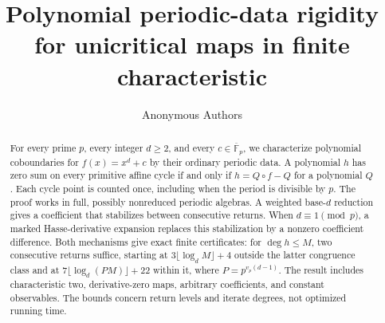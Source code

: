 \documentclass[11pt]{article}
\title{Polynomial periodic-data rigidity for unicritical maps in finite characteristic}
\author{Anonymous Authors}
\date{}
\begin{document}
\maketitle
\begin{abstract}
For every prime $p$, every integer $d\ge2$, and every
$c\in\overline{\mathbb F}_p$, we characterize polynomial coboundaries
for $f(x)=x^d+c$ by their ordinary periodic data. A polynomial $h$ has
zero sum on every primitive affine cycle if and only if
$h=Q\circ f-Q$ for a polynomial $Q$. Each cycle point is counted once,
including when the period is divisible by $p$. The proof works in full,
possibly nonreduced periodic algebras. A weighted base-$d$ reduction
gives a coefficient that stabilizes between consecutive returns. When
$d\equiv1\pmod p$, a marked Hasse-derivative expansion replaces this
stabilization by a nonzero coefficient difference. Both mechanisms give
exact finite certificates: for $\deg h\le M$, two consecutive returns
suffice, starting at $3\lfloor\log_d M\rfloor+4$ outside the latter
congruence class and at $7\lfloor\log_d(PM)\rfloor+22$ within it,
where $P=p^{v_p(d-1)}$. The result includes characteristic two,
derivative-zero maps, arbitrary coefficients, and constant observables.
The bounds concern return levels and iterate degrees, not optimized
running time.
\end{abstract}









\end{document}

